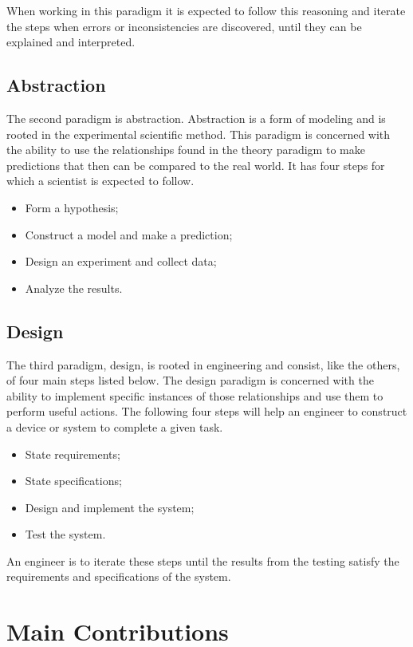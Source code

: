 \documentclass[thesis.tex]{subfiles}
\begin{document}
When working in this paradigm it is expected to follow this reasoning and iterate the steps when errors or inconsistencies are discovered, until they can be explained and interpreted.

\subsection{Abstraction} \label{sec:abstraction}
The second paradigm is abstraction. Abstraction is a form of modeling and is rooted in the experimental scientific method. This paradigm is concerned with the ability to use the relationships found in the theory paradigm to make predictions that then can be compared to the real world. It has four steps for which a scientist is expected to follow. 

\begin{itemize}
\item Form a hypothesis;
\item Construct a model and make a prediction;
\item Design an experiment and collect data;
\item Analyze the results.
\end{itemize}

\subsection{Design} \label{sec:design}
The third paradigm, design, is rooted in engineering and consist, like the others, of four main steps listed below. The design paradigm is concerned with the ability to implement specific instances of those relationships and use them to perform useful actions. The following four steps will help an engineer to construct a device or system to complete a given task.

\begin{itemize}
\item State requirements;
\item State specifications;
\item Design and implement the system;
\item Test the system.
\end{itemize}

An engineer is to iterate these steps until the results from the testing satisfy the requirements and specifications of the system.


\section{Main Contributions} \label{sec:main_contributions}
\end{document}
